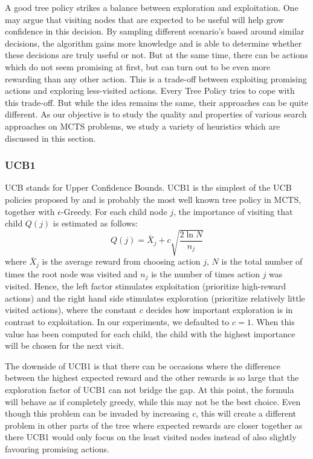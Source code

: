 A good tree policy strikes a balance between exploration and exploitation. One may argue that visiting nodes that are expected to be useful will help grow confidence in this decision. By sampling different scenario's based around similar decisions, the algorithm gains more knowledge and is able to determine whether these decisions are truly useful or not. But at the same time, there can be actions which do not seem promising at first, but can turn out to be even more rewarding than any other action. This is a trade-off between exploiting promising actions and exploring less-visited actions. Every Tree Policy tries to cope with this trade-off. But while the idea remains the same, their approaches can be quite different. As our objective is to study the quality and properties of various search approaches on MCTS problems, we study a variety of heuristics which are discussed in this section. \\

\subsubsection{UCB1}
UCB stands for Upper Confidence Bounds. UCB1 is the simplest of the UCB policies proposed by \cite{auer2002finite} and is probably the most well known tree policy in MCTS, together with $\epsilon$-Greedy. For each child node $j$, the importance of visiting that child $Q(j)$ is estimated as follows:
\begin{equation}
Q(j) = \bar{X}_j + c\sqrt{\frac{2 \ln N}{n_j}}
\end{equation}
where $\bar{X}_j$ is the average reward from choosing action $j$, $N$ is the total number of times the root node was visited and $n_j$ is the number of times action $j$ was visited. Hence, the left factor stimulates exploitation (prioritize high-reward actions) and the right hand side stimulates exploration (prioritize relatively little visited actions), where the constant $c$ decides how important exploration is in contrast to exploitation. In our experiments, we defaulted to $c=1$. When this value has been computed for each child, the child with the highest importance will be chosen for the next visit. 

The downside of UCB1 is that there can be occasions where the difference between the highest expected reward and the other rewards is so large that the exploration factor of UCB1 can not bridge the gap. At this point, the formula will behave as if completely greedy, while this may not be the best choice. Even though this problem can be invaded by increasing $c$, this will create a different problem in other parts of the tree where expected rewards are closer together as there UCB1 would only focus on the least visited nodes instead of also slightly favouring promising actions.  \\

